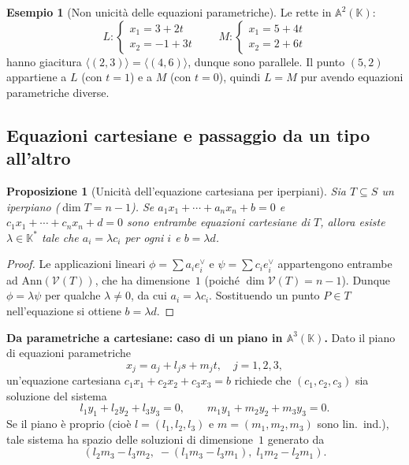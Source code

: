 \documentclass[11pt, a4paper]{book}
\theoremstyle{definition}
\newtheorem{esempio}[definizione]{Esempio}
\theoremstyle{plain}
\newtheorem{proposizione}[definizione]{Proposizione}
\theoremstyle{remark}
\newcommand{\K}{\mathbb{K}}
\newcommand{\Ann}{\mathrm{Ann}}
\newcommand{\VV}{\mathcal{V}}   %
\begin{document}
\begin{exbox}
\begin{esempio}[Non unicità delle equazioni parametriche]
Le rette in $\mathbb{A}^2(\K)$:
\[
  L\colon \begin{cases} x_1 = 3 + 2t \\ x_2 = -1 + 3t \end{cases} \qquad M\colon \begin{cases} x_1 = 5 + 4t \\ x_2 = 2 + 6t \end{cases}
\]
hanno giacitura $\langle (2,3) \rangle = \langle (4,6) \rangle$, dunque sono parallele. Il punto $(5,2)$ appartiene a $L$ (con $t=1$) e a $M$ (con $t=0$), quindi $L = M$ pur avendo equazioni parametriche diverse.
\end{esempio}
\end{exbox}

\subsection{Equazioni cartesiane e passaggio da un tipo all'altro}

\begin{proposizione}[Unicità dell'equazione cartesiana per iperpiani]
Sia $T \subseteq S$ un iperpiano ($\dim T = n-1$). Se $a_1 x_1 + \cdots + a_n x_n + b = 0$ e $c_1 x_1 + \cdots + c_n x_n + d = 0$ sono entrambe equazioni cartesiane di $T$, allora esiste $\lambda \in \K^*$ tale che $a_i = \lambda c_i$ per ogni $i$ e $b = \lambda d$.
\end{proposizione}

\begin{proof}
Le applicazioni lineari $\phi = \sum a_i e_i^\vee$ e $\psi = \sum c_i e_i^\vee$ appartengono entrambe ad $\Ann(\VV(T))$, che ha dimensione~$1$ (poiché $\dim \VV(T) = n - 1$). Dunque $\phi = \lambda \psi$ per qualche $\lambda \neq 0$, da cui $a_i = \lambda c_i$. Sostituendo un punto $P \in T$ nell'equazione si ottiene $b = \lambda d$.
\end{proof}

\bigskip
\noindent\textbf{Da parametriche a cartesiane: caso di un piano in $\mathbb{A}^3(\K)$.}
Dato il piano di equazioni parametriche
\[
  x_j = a_j + l_j s + m_j t, \quad j = 1,2,3,
\]
un'equazione cartesiana $c_1 x_1 + c_2 x_2 + c_3 x_3 = b$ richiede che $(c_1,c_2,c_3)$ sia soluzione del sistema
\[
  l_1 y_1 + l_2 y_2 + l_3 y_3 = 0, \qquad m_1 y_1 + m_2 y_2 + m_3 y_3 = 0.
\]
Se il piano è proprio (cioè $l = (l_1,l_2,l_3)$ e $m = (m_1,m_2,m_3)$ sono lin.\ ind.), tale sistema ha spazio delle soluzioni di dimensione~$1$ generato da
\[
  (l_2 m_3 - l_3 m_2,\; -(l_1 m_3 - l_3 m_1),\; l_1 m_2 - l_2 m_1).
\]
\end{document}
